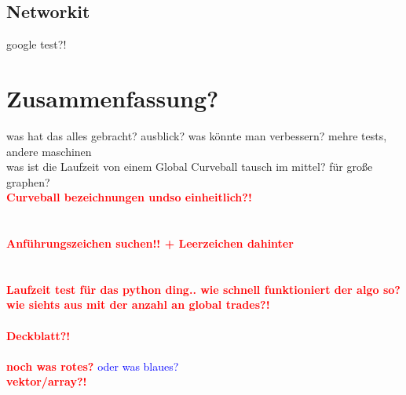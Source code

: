 \documentclass[a4paper]{scrreprt}
\theoremstyle{plain} %
\theoremstyle{definition} %
\newcommand{\gc}{Global Curveball}
\newcommand{\cb}{Curveball}
\newcommand{\red}[1]{\textcolor{red}{\textbf{#1}}}
\newcommand{\blue}[1]{\textcolor{blue}{#1}}
\begin{document}
\section{Networkit}
google test?!





\chapter{Zusammenfassung?}
was hat das alles gebracht?
ausblick?
was könnte man verbessern? mehre tests, andere maschinen
\\
was ist die Laufzeit von einem \gc{} tausch im mittel? für große graphen?
\\
\red{\Large \cb{} bezeichnungen undso einheitlich?!}
\\
\\
\\
\red{\Large Anführungszeichen suchen!! + Leerzeichen dahinter}
\\
\\
\\
\red{\huge Laufzeit test für das python ding.. wie schnell funktioniert der algo so?}
\red{wie siehts aus mit der anzahl an global trades?!}
\\
\\
\red{\Large Deckblatt?!}
\\
\\
\red{noch was rotes?} \blue{oder was blaues?}
\\
\red{vektor/array?!}



  



\listoffigures
\end{document}
